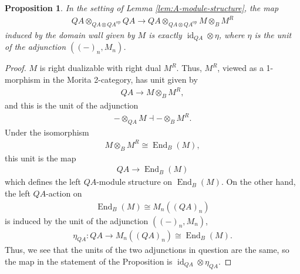 \documentclass[10pt,a4paper]{amsart}
\newtheorem{prop}{Proposition}
\DeclareMathOperator{\End}{End}
\DeclareMathOperator{\id}{id}
\begin{document}
\begin{prop}\label{prop:domain-wall-map-is-counit}
	In the setting of Lemma \ref{lem:A-module-structure}, the map
\begin{align*}
	QA \otimes _{QA\otimes QA^{\text{op}}}QA\to QA\otimes _{QA\otimes QA^{\text{op}}}M\otimes _BM^R
\end{align*}
induced by the domain wall given by $M$ is exactly $\id_{QA}\otimes \eta$, where $\eta$ is the unit of the adjunction $((-)_n,M_n)$. 
\end{prop}

\begin{proof}
	$M$ is right dualizable with right dual $M^R$. Thus, $M^R$, viewed as a 1-morphism in the Morita 2-category, has unit given by
	\begin{align*}
		QA\to M\otimes _BM^R,
	\end{align*} 
	and this is the unit of the adjunction
	\begin{align*}
		-\otimes _{QA}M\dashv-\otimes _BM^R.
	\end{align*} 
	Under the isomorphism
	\begin{align*}
		M\otimes _BM^R\cong \End_B(M),
	\end{align*} 
	this unit is the map
	\begin{align*}
		QA\to \End_B(M)
	\end{align*} 
	which defines the left $QA$-module structure on $\End_B(M)$. On the other hand, the left $QA$-action on
	\begin{align*}
		\End_B(M)\cong M_n((QA)_n)
	\end{align*} 
	is induced by the unit of the adjunction $((-)_n,M_n)$,
	\begin{align*}
		\eta_{QA}:QA\to M_n((QA)_n)\cong\End_{B}(M).
	\end{align*} 
	Thus, we see that the units of the two adjunctions in question are the same, so the map in the statement of the Proposition is $\id_{QA}\otimes \eta_{QA}$.
\end{proof}
\end{document}
